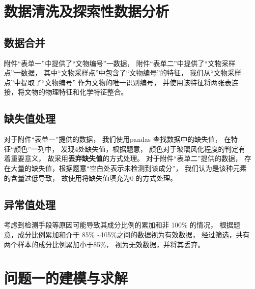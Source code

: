 \documentclass[withoutpreface,bwprint]{cumcmthesis} %
\begin{document}




\section{数据清洗及探索性数据分析}

\subsection{数据合并}

附件``表单一''中提供了``文物编号''一数据，
附件``表单二''中提供了``文物采样点''一数据，
其中``文物采样点''中包含了``文物编号''的特征，
我们从``文物采样点''中提取了``文物编号'' 作为文物的唯一识别编号，
并使用该特征将两张表连接，将文物的物理特征和化学特征整合。


\subsection{缺失值处理}
对于附件``表单一''提供的数据，
我们使用pandas \cite{reback2020pandas} 查找数据中的缺失值，
在特征``颜色''一列中，
发现4处缺失值，根据题意，
颜色对于玻璃风化程度的判定有着重要意义，
故采用\textbf{丢弃缺失值}的方式处理。
对于附件``表单二''提供的数据，
存在大量的缺失值，根据题意``空白处表示未检测到该成分''，
我们认为是该种元素的含量过低导致，
故使用将缺失值填充为$ 0 $ 的方式处理。


\subsection{异常值处理}
考虑到检测手段等原因可能导致其成分比例的累加和非 100\% 的情况，
根据题意，成分比例累加和介于 85\% \textasciitilde 105\%之间的数据视为有效数据，
经过筛选，共有两个样本的成分比例累加小于85\%，
视为无效数据，并将其丢弃。

\section{问题一的建模与求解}
\end{document}
